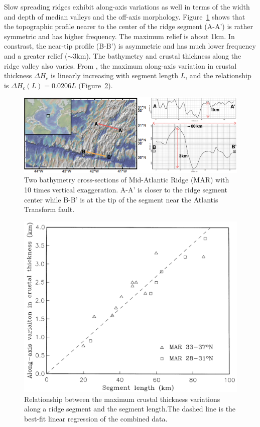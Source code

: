 \documentclass[12pt]{article}
\begin{document}
Slow spreading ridges exhibit along-axis variations as well in terms of the width and depth of median valleys and the off-axis morphology.  Figure~\ref{fig2_1} shows that the topographic profile nearer to the center of the ridge segment (A-A') is rather symmetric and has higher frequency. The maximum relief is about 1km. In constrast, the near-tip profile (B-B') is asymmetric and has much lower frequency and a greater relief ($\sim$3km). The bathymetry and crustal thickness along the ridge valley also varies. From \citep{Chen1999}, the maximum along-axis variation in crustal thickness $\Delta H_{c}$ is linearly increasing with segment length $L$, and the relationship is $\Delta H_{c}(L)=0.0206L$ (Figure~\ref{fig3_1}).

\begin{figure}[H]
 \centering
  \includegraphics[scale=0.4]{fig2_1.png}
 \caption{\small{Two bathymetry cross-sections of Mid-Atlantic Ridge (MAR) with 10 times vertical exaggeration. A-A' is closer to the ridge segment center while B-B' is at the tip of the segment near the Atlantis Transform fault.}}
 \label{fig2_1}
\end{figure}

\begin{figure}[H]
 \centering
  \includegraphics[scale=0.3]{fig3_1.png}
 \caption{\small{Relationship between the maximum crustal thickness variations along a ridge segment and the segment length.The dashed line is the best-fit linear regression of the combined data. \citep{Chen1999}}}
 \label{fig3_1}
\end{figure}
\end{document}
